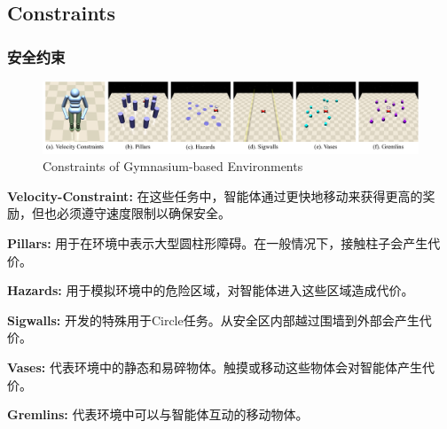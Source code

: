 \documentclass[10pt,mathserif]{beamer}%
\begin{document}
\subsection{Constraints}
\begin{frame}[t,fragile]
    \frametitle{安全约束}
\begin{figure}[ht]
  \centering
  \includegraphics[width=0.9\linewidth]{Safety-Gymnasium/assets/main-paper/constraints.pdf}
  \caption{Constraints of Gymnasium-based Environments}
  \label{pic:agent}
\end{figure}
\vspace{-0.5cm}
\begin{spacing}{1.2}
\begin{itemize}
{
\fontsize{8pt}{9.6pt}\selectfont
    \item \textbf{Velocity-Constraint:} 在这些任务中，智能体通过更快地移动来获得更高的奖励，但也必须遵守速度限制以确保安全。
    \item \textbf{Pillars:} 用于在环境中表示大型圆柱形障碍。在一般情况下，接触柱子会产生代价。
    \item \textbf{Hazards:} 用于模拟环境中的危险区域，对智能体进入这些区域造成代价。
    \item \textbf{Sigwalls:} 开发的特殊用于Circle任务。从安全区内部越过围墙到外部会产生代价。
    \item \textbf{Vases:} 代表环境中的静态和易碎物体。触摸或移动这些物体会对智能体产生代价。
    \item \textbf{Gremlins:} 代表环境中可以与智能体互动的移动物体。
}
\end{itemize}
\end{spacing}
\end{frame}
\end{document}
